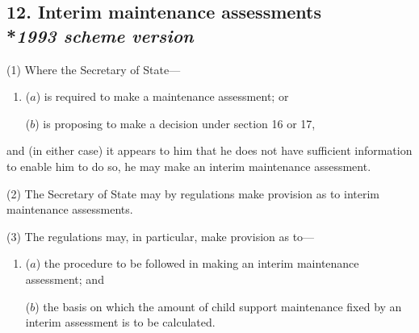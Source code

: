 \documentclass[12pt,a4paper]{article}
\begin{document}
\subsection[12. Interim maintenance assessments --- \emph{1993 scheme version}]{12. Interim maintenance assessments\\*\emph{1993 scheme version}}


%
%
%
%
%

(1) Where the Secretary of State—
\begin{enumerate}\item[]
($a$) is required to make a maintenance assessment; or

($b$) is proposing to make a decision under section 16 or 17,
\end{enumerate}
and (in either case) it appears to him that he does not have sufficient information to enable him to do so, he may make an interim maintenance assessment.

(2) The Secretary of State may by regulations make provision as to interim maintenance assessments.

(3) The regulations may, in particular, make provision as to—
\begin{enumerate}\item[]
($a$) the procedure to be followed in making an interim maintenance assessment; and

($b$) the basis on which the amount of child support maintenance fixed by an interim assessment is to be calculated.
\end{enumerate}
\end{document}

